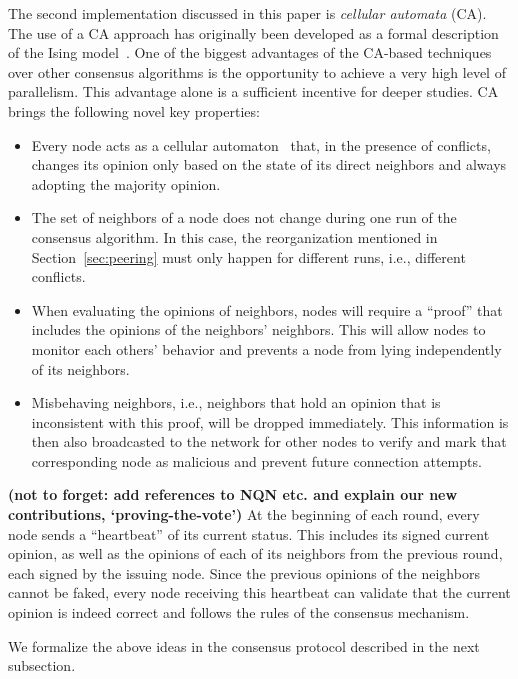 \documentclass[../main.tex]{subfiles}
\begin{document}
\label{s_cellular}
The second implementation discussed in this paper is \textit{cellular automata} (CA). The use of a CA approach has originally been developed as a formal description of the Ising model~\cite{ising1925}.
One of the biggest advantages of the CA-based techniques over other consensus algorithms is the opportunity to achieve a very high level of parallelism.
This advantage alone is a sufficient incentive for deeper studies. CA brings the following novel key properties:
\begin{itemize}
    \item Every node acts as a cellular automaton~\cite{codd1968} that, in the presence of conflicts, changes its opinion only based on the state of its direct neighbors and always adopting the majority opinion. 
    \item The set of neighbors of a node does not change during one run of the consensus algorithm.
    In this case, the reorganization mentioned in Section~\ref{sec:peering} must only happen for different runs, i.e., different conflicts.
    \item When evaluating the opinions of neighbors, nodes will require a “proof” that includes the opinions of the neighbors' neighbors. This will allow nodes to monitor each others' behavior and prevents a node from lying independently of its neighbors.
    \item Misbehaving neighbors, i.e., neighbors that hold an opinion that is inconsistent with this proof, will be dropped immediately.
    This information is then also broadcasted to the network for other nodes to verify and mark that corresponding node as malicious and prevent future connection attempts.
\end{itemize}

\textbf{(not to forget: add references to NQN etc. and explain our new contributions,
`proving-the-vote')}
At the beginning of each round, every node sends a ``heartbeat'' of its current status. 
This includes its signed current opinion, as well as the opinions of each of its neighbors from the previous round, each signed by the issuing node.
Since the previous opinions of the neighbors cannot be faked, every node receiving this heartbeat can validate that the current opinion is indeed correct and follows the rules of the consensus mechanism.

We formalize the above ideas in the consensus protocol described in the next subsection.

\end{document}
